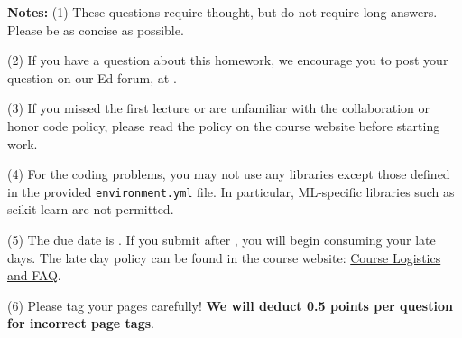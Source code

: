 {\bf Notes:} 
(1) These questions require thought, but do not require long
answers. Please be as concise as possible.  

(2) If you have a question
about this homework, we encourage you to post your question on our
Ed forum, at \edstem. 

(3) If you
missed the first lecture or are unfamiliar with the collaboration or honor
code policy, please read the policy on the course website before starting work.

(4) For the coding problems, you may not
use any libraries except those defined in the provided \texttt{environment.yml}
file. In particular, ML-specific libraries such as scikit-learn are not
permitted. 

(5) The due date is \due. If you submit after
\due, you will begin consuming your
late days. The late day policy can be found in the course website:  \href{https://docs.google.com/document/d/1OCFrAj-Zniw5gzjeAKxVRFCvi-u0qnTv/edit#heading=h.gjdgxs}{Course Logistics and FAQ}.

(6) Please tag your pages carefully! {\bf We will deduct 0.5 points per question for incorrect page tags}.


